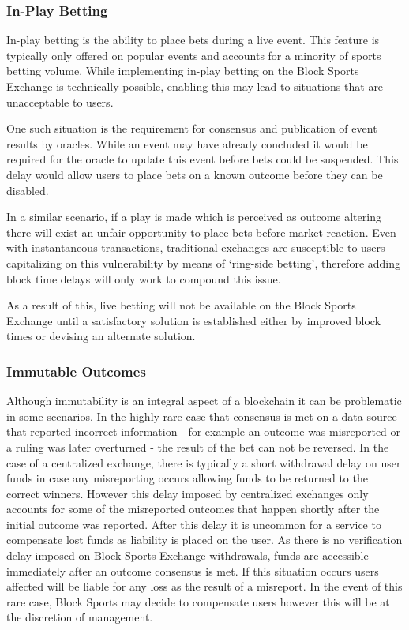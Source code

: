 \documentclass{article}
\begin{document}
		\subsubsection{In-Play Betting}
In-play betting is the ability to place bets during a live event. This feature is typically only offered on popular events and accounts for a minority of sports betting volume. While implementing in-play betting on the Block Sports Exchange is technically possible, enabling this may lead to situations that are unacceptable to users.

One such situation is the requirement for consensus and publication of event results by oracles. While an event may have already concluded it would be required for the oracle to update this event before bets could be suspended. This delay would allow users to place bets on a known outcome before they can be disabled.

In a similar scenario, if a play is made which is perceived as outcome altering there will exist an unfair opportunity to place bets before market reaction. Even with instantaneous transactions, traditional exchanges are susceptible to users capitalizing on this vulnerability by means of ‘ring-side betting’, therefore adding block time delays will only work to compound this issue.

As a result of this, live betting will not be available on the Block Sports Exchange until a satisfactory solution is established either by improved block times or devising an alternate solution.

		\subsubsection{Immutable Outcomes}
Although immutability is an integral aspect of a blockchain it can be problematic in some scenarios. In the highly rare case that consensus is met on a data source that reported incorrect information - for example an outcome was misreported or a ruling was later overturned - the result of the bet can not be reversed. In the case of a centralized exchange, there is typically a short withdrawal delay on user funds in case any misreporting occurs allowing funds to be returned to the correct winners. However this delay imposed by centralized exchanges only accounts for some of the misreported outcomes that happen shortly after the initial outcome was reported. After this delay it is uncommon for a service to compensate lost funds as liability is placed on the user. As there is no verification delay imposed on Block Sports Exchange withdrawals, funds are accessible immediately after an outcome consensus is met. If this situation occurs users affected will be liable for any loss as the result of a misreport. In the event of this rare case, Block Sports may decide to compensate users however this will be at the discretion of management.
\end{document}
